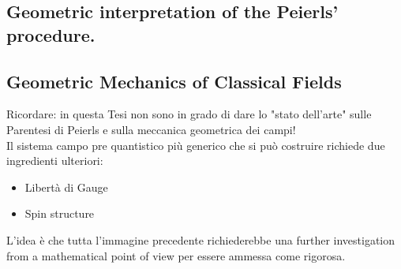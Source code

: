 \documentclass[Main]{subfiles}
\begin{document}
	\subsection{Geometric interpretation of the Peierls' procedure.}




	\subsection{Geometric Mechanics of Classical Fields}
	
\ifToninus
	\begin{Warning}
		Ricordare: in questa Tesi non sono in grado di dare lo "stato dell'arte" sulle Parentesi di Peierls e sulla meccanica geometrica dei campi!\\
		Il sistema campo pre quantistico più generico che si può costruire richiede due ingredienti ulteriori:
		\begin{itemize}
			\item Libertà di Gauge
			\item Spin structure
		\end{itemize}

	L'idea è che tutta l'immagine precedente richiederebbe una further investigation from a mathematical point of view per essere ammessa come rigorosa.
	\end{Warning}
\end{document}
